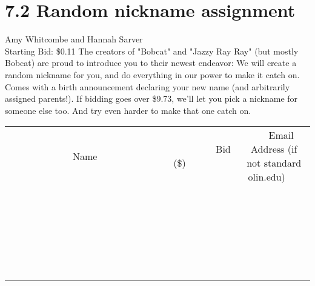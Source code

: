 \documentclass[11pt]{article}
\begin{document}
\section*{7.2 Random nickname assignment}
Amy Whitcombe and Hannah Sarver
\\
Starting Bid: \$0.11
\newline
The creators of "Bobcat" and "Jazzy Ray Ray" (but mostly Bobcat) are proud to introduce you to their newest endeavor: We will create a random nickname for you, and do everything in our power to make it catch on. Comes with a birth announcement declaring your new name (and arbitrarily assigned parents!). If bidding goes over \$9.73, we'll let you pick a nickname for someone else too. And try even harder to make that one catch on.
\\[6ex]
\begin{tabular}{c c c}
~~~~~~~~~~~~~Name~~~~~~~~~~~~~ & ~~~~~~~~~Bid (\$)~~~~~~~~~  & ~~~Email Address (if not standard olin.edu)~~~\\
 & & \\
\hline
 & & \\
\hline
 & & \\
\hline
 & & \\
\hline
 & & \\
\hline
 & & \\
\hline
 & & \\
\hline
 & & \\
\hline
 & & \\
\hline
 & & \\
\hline
 & & \\
\hline
 & & \\
\hline
 & & \\
\hline
 & & \\
\hline
 & & \\
\hline
 & & \\
\hline
 & & \\
\hline
 & & \\
\hline
 & & \\
\hline
 & & \\
\hline
 & & \\
\hline
 & & \\
\hline
 & & \\
\hline
 & & \\
\hline
 & & \\
\hline
 & & \\
\hline
\end{tabular}
\newpage
\end{document}
